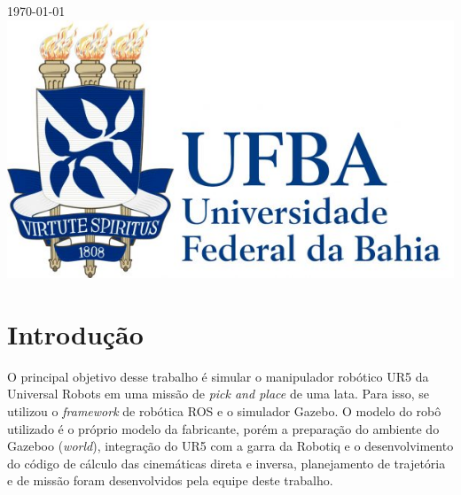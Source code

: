 \begin{titlepage}

{\large \today}\\[2cm] %


\includegraphics[scale=0.3]{images/ufba_logo.jpg}\\[1cm] %
 

\vfill %

\end{titlepage}

\tableofcontents
\pagebreak

\listoffigures
\pagebreak

\listoftables
\pagebreak

\section{Introdução}

O principal objetivo desse trabalho é simular o manipulador robótico UR5
da Universal Robots em uma missão de \textit{pick and place} de 
uma lata. Para isso, se utilizou o \textit{framework} de robótica ROS 
e o simulador Gazebo. O modelo do robô utilizado é o próprio modelo da 
fabricante, porém a preparação do ambiente do Gazeboo (\textit{world}),
integração do UR5 com a garra da Robotiq  e o desenvolvimento do código
de cálculo das cinemáticas direta e inversa, planejamento de trajetória e 
de missão foram desenvolvidos pela equipe deste trabalho.

